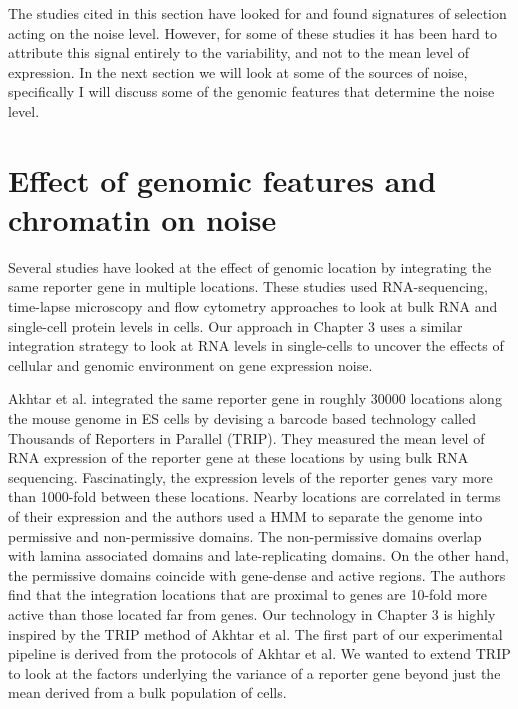 The studies cited in this section have looked for and found signatures of selection acting on the noise level. However, for some of these studies it has been hard to attribute this signal entirely to the variability, and not to the mean level of expression. In the next section we will look at some of the sources of noise, specifically I will discuss some of the genomic features that determine the noise level.

\section{Effect of genomic features and chromatin on noise}

Several studies have looked at the effect of genomic location by integrating the same reporter gene in multiple locations. These studies used RNA-sequencing, time-lapse microscopy and flow cytometry approaches to look at bulk RNA and single-cell protein levels in cells. Our approach in Chapter 3 uses a similar integration strategy to look at RNA levels in single-cells to uncover the effects of cellular and genomic environment on gene expression noise.

Akhtar et al. \cite{akhtarw_vansteenselb:ChromatinPosition2013} integrated the same reporter gene in roughly 30000 locations along the mouse genome in ES cells by devising a barcode based technology called Thousands of Reporters in Parallel (TRIP). They measured the mean level of RNA expression of the reporter gene at these locations by using bulk RNA sequencing. Fascinatingly, the expression levels of the reporter genes vary more than 1000-fold between these locations. Nearby locations are correlated in terms of their expression and the authors used a HMM to separate the genome into permissive and non-permissive domains. The non-permissive domains overlap with lamina associated domains and late-replicating domains. On the other hand, the permissive domains coincide with gene-dense and active regions. The authors find that the integration locations that are proximal to genes are 10-fold more active than those located far from genes. Our technology in Chapter 3 is highly inspired by the TRIP method of Akhtar et al. The first part of our experimental pipeline is derived from the protocols of Akhtar et al. We wanted to extend TRIP to look at the factors underlying the variance of a reporter gene beyond just the mean derived from a bulk population of cells.

